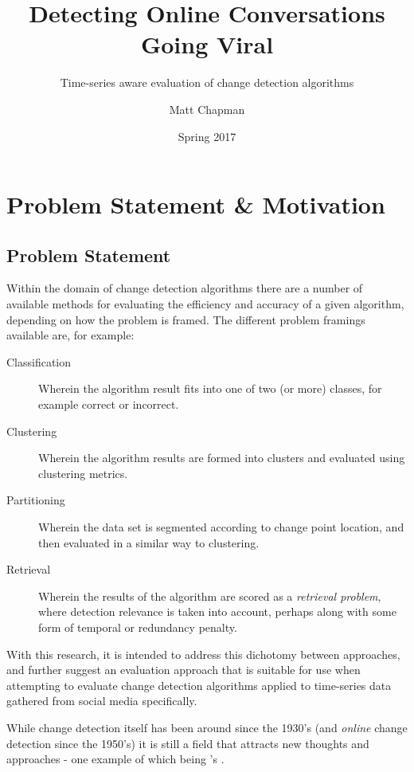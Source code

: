 \documentclass{uvamscse}	%
\title{Detecting Online Conversations Going Viral}
\subtitle{Time-series aware evaluation of change detection algorithms}
\date{Spring 2017}
\author{Matt Chapman}
\begin{document}
\nocite{*}
\maketitle


\chapter{Problem Statement \& Motivation}

\section{Problem Statement}

Within the domain of change detection algorithms there are a number of available methods for evaluating the efficiency and accuracy of a given algorithm, depending on how the problem is framed. The different problem framings available are, for example:

\begin{description}
	\item[Classification] Wherein the algorithm result fits into one of two (or more) classes, for example correct or incorrect.
	\item[Clustering] Wherein the algorithm results are formed into clusters and evaluated using clustering metrics.
	\item[Partitioning] Wherein the data set is segmented according to change point location, and then evaluated in a similar way to clustering.
	\item[Retrieval] Wherein the results of the algorithm are scored as a \emph{retrieval problem}, where detection relevance is taken into account, perhaps along with some form of temporal or redundancy penalty.
\end{description}

With this research, it is intended to address this dichotomy between approaches, and further suggest an evaluation approach that is suitable for use when attempting to evaluate change detection algorithms applied to time-series data gathered from social media specifically.

While change detection itself has been around since the 1930's (and \emph{online} change detection since the 1950's) it is still a field that attracts new thoughts and approaches - one example of which being \citeauthor{Ginsberg2009}'s  \cite{Ginsberg2009}.
\end{document}
